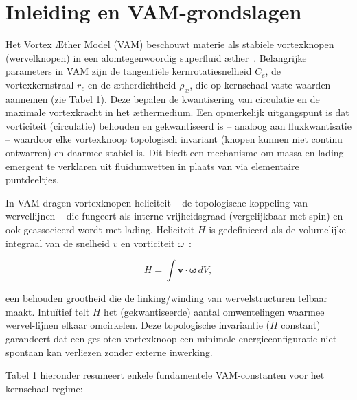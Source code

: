 
\section{Inleiding en VAM-grondslagen}

Het Vortex Æther Model (VAM) beschouwt materie als stabiele vortexknopen (wervelknopen) in een alomtegenwoordig superfluïd æther~\cite{Kelvin1867VortexAtoms}. Belangrijke parameters in VAM zijn de tangentiële kernrotatiesnelheid $C_e$, de vortexkernstraal $r_c$ en de
ætherdichtheid $\rho_\text{\ae}$, die op kernschaal vaste waarden aannemen (zie Tabel 1). Deze bepalen de kwantisering van circulatie en de maximale vortexkracht in het æthermedium. Een opmerkelijk uitgangspunt is dat vorticiteit (circulatie) behouden en gekwantiseerd is – analoog aan fluxkwantisatie – waardoor elke vortexknoop topologisch invariant (knopen kunnen niet continu ontwarren) en daarmee stabiel is. Dit biedt een mechanisme om massa en lading emergent te verklaren uit fluïdumwetten in plaats van via elementaire puntdeeltjes.

In VAM dragen vortexknopen heliciteit – de topologische koppeling van wervellijnen – die fungeert als interne vrijheidsgraad (vergelijkbaar met
spin) en ook geassocieerd wordt met lading. Heliciteit $H$ is gedefinieerd als de volumelijke integraal van de snelheid $v$ en vorticiteit $\omega$~\cite{Moffatt1990VortexHelicity,Ricca1992EnergyHelicity}:


\begin{equation}
    H = \int \mathbf{v} \cdot \boldsymbol{\omega}\,dV,
\end{equation}

een behouden grootheid die de linking/winding van wervelstructuren telbaar maakt. Intuïtief telt $H$ het (gekwantiseerde) aantal omwentelingen waarmee wervel-lijnen elkaar omcirkelen. Deze topologische invariantie ($H$ constant) garandeert dat een gesloten vortexknoop een minimale energieconfiguratie niet spontaan kan verliezen zonder externe inwerking.

Tabel 1 hieronder resumeert enkele fundamentele VAM-constanten voor het kernschaal-regime:

